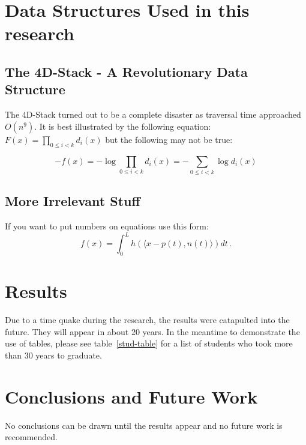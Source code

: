\documentclass[11pt]{report}
\begin{document}

\chapter{Data Structures Used in this research}
\section{The 4D-Stack - A Revolutionary Data Structure}
The 4D-Stack turned out to be a complete disaster as traversal time approached $O(n^9).$
It is best illustrated by the following equation: $F(x) = \prod_{0\leq i<k}d_i(x)$
but the following may not be true:

\[
-f(x) = - \log \prod_{0\leq i<k}d_i(x) = - \sum_{0\leq i<k} \log d_i(x)
\]


\section{More Irrelevant Stuff}
If you want to put numbers on equations use this form:
\begin{equation}
\label{integralrep}
f(x)=\int_0^L h( \langle x-p(t),n(t) \rangle ) dt\,.
\end{equation}



\chapter{Results}

Due to a time quake during the research, the results were catapulted into the future.  They will appear in about 20 years.
In the meantime to demonstrate the use of tables, please see table~\ref{stud-table} for a list of students who took more than 30 years to graduate.

\chapter{Conclusions and Future Work}
No conclusions can be drawn until the results appear and no future work is recommended.




\end{document}
